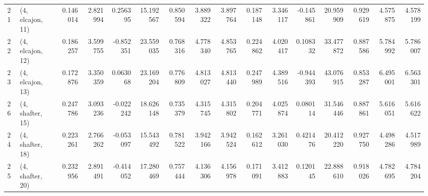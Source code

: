 \begin{tabular}{llrrrrrrrrrrrrrr}
21 &  (4, elcajon, 11) &   0.146014 &  2.821994 &  0.256395 &   15.192567 &  0.850594 &   3.889322 &   3.897764 &  0.187148 &   3.346117 & -0.145861 &   20.959909 &  0.929619 &   4.575875 &   4.578199 \\
22 &  (4, elcajon, 12) &   0.186257 &  3.599755 & -0.852351 &   23.559035 &  0.768316 &   4.778340 &   4.853765 &  0.224862 &   4.020417 &  0.108332 &   33.477872 &  0.887586 &   5.784992 &   5.786007 \\
23 &  (4, elcajon, 13) &   0.172876 &  3.350359 &  0.063068 &   23.169204 &  0.776809 &   4.813027 &   4.813440 &  0.247989 &   4.389516 & -0.944393 &   43.076915 &  0.853287 &   6.495001 &   6.563301 \\
26 &  (4, shafter, 15) &   0.247786 &  3.093236 & -0.022242 &   18.626148 &  0.735379 &   4.315745 &   4.315802 &  0.204771 &   4.025874 &  0.080114 &   31.546446 &  0.887861 &   5.616051 &   5.616622 \\
24 &  (4, shafter, 18) &   0.223261 &  2.766262 & -0.053097 &   15.543492 &  0.781522 &   3.942166 &   3.942524 &  0.162612 &   3.261030 &  0.421476 &   20.412220 &  0.927750 &   4.498286 &   4.517989 \\
25 &  (4, shafter, 20) &   0.232956 &  2.891491 & -0.414052 &   17.280469 &  0.757444 &   4.136306 &   4.156978 &  0.171091 &   3.412883 &  0.120145 &   22.888610 &  0.918026 &   4.782695 &   4.784204 \\
\bottomrule
\end{tabular}
